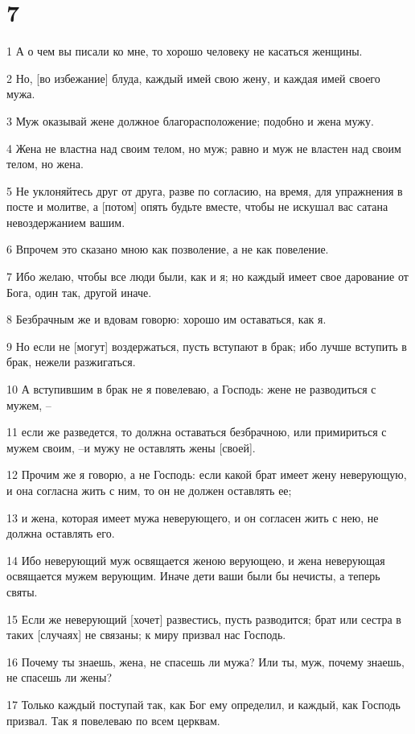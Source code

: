 \chapter{7}

\par 1 А о чем вы писали ко мне, то хорошо человеку не касаться женщины.
\par 2 Но, [во избежание] блуда, каждый имей свою жену, и каждая имей своего мужа.
\par 3 Муж оказывай жене должное благорасположение; подобно и жена мужу.
\par 4 Жена не властна над своим телом, но муж; равно и муж не властен над своим телом, но жена.
\par 5 Не уклоняйтесь друг от друга, разве по согласию, на время, для упражнения в посте и молитве, а [потом] опять будьте вместе, чтобы не искушал вас сатана невоздержанием вашим.
\par 6 Впрочем это сказано мною как позволение, а не как повеление.
\par 7 Ибо желаю, чтобы все люди были, как и я; но каждый имеет свое дарование от Бога, один так, другой иначе.
\par 8 Безбрачным же и вдовам говорю: хорошо им оставаться, как я.
\par 9 Но если не [могут] воздержаться, пусть вступают в брак; ибо лучше вступить в брак, нежели разжигаться.
\par 10 А вступившим в брак не я повелеваю, а Господь: жене не разводиться с мужем, --
\par 11 если же разведется, то должна оставаться безбрачною, или примириться с мужем своим, --и мужу не оставлять жены [своей].
\par 12 Прочим же я говорю, а не Господь: если какой брат имеет жену неверующую, и она согласна жить с ним, то он не должен оставлять ее;
\par 13 и жена, которая имеет мужа неверующего, и он согласен жить с нею, не должна оставлять его.
\par 14 Ибо неверующий муж освящается женою верующею, и жена неверующая освящается мужем верующим. Иначе дети ваши были бы нечисты, а теперь святы.
\par 15 Если же неверующий [хочет] развестись, пусть разводится; брат или сестра в таких [случаях] не связаны; к миру призвал нас Господь.
\par 16 Почему ты знаешь, жена, не спасешь ли мужа? Или ты, муж, почему знаешь, не спасешь ли жены?
\par 17 Только каждый поступай так, как Бог ему определил, и каждый, как Господь призвал. Так я повелеваю по всем церквам.
